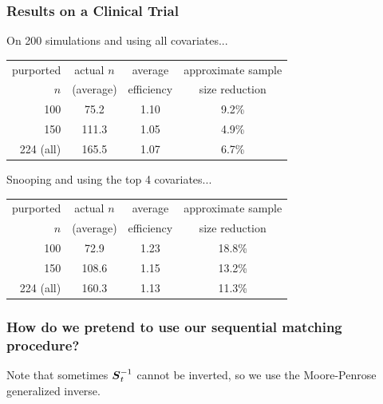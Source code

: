 \documentclass[slides]{beamer} %
\begin{document}
\begin{frame}\frametitle{Results on a Clinical Trial}

On 200 simulations and using all covariates... \pause

\begin{table}[htp]
\centering
\begin{tabular}{r|ccc}
purported  & actual $n$  & average & approximate sample  \\
 $n$ & (average) & efficiency & size reduction \\ \hline
100 & 75.2 & 1.10 & 9.2\% \\
150 & 111.3 & 1.05 & 4.9\% \\
224 (all) & 165.5 & 1.07 & 6.7\%
\end{tabular}
\end{table}
\pause
Snooping and using the top 4 covariates... \pause

\begin{table}[htp]
\centering
\begin{tabular}{r|ccc}
purported  & actual $n$  & average & approximate sample  \\
 $n$ & (average) & efficiency & size reduction \\ \hline
100 & 72.9 & 1.23 & 18.8\% \\
150 & 108.6 & 1.15 & 13.2\% \\
224 (all) & 160.3 & 1.13 & 11.3\%
\end{tabular}
\end{table}

\end{frame}

\begin{frame}\frametitle{How do we pretend to use our sequential matching procedure?}


Note that sometimes $\boldsymbol{S}_t^{-1}$ cannot be inverted, so we use the Moore-Penrose generalized inverse.

\end{frame}
\end{document}

